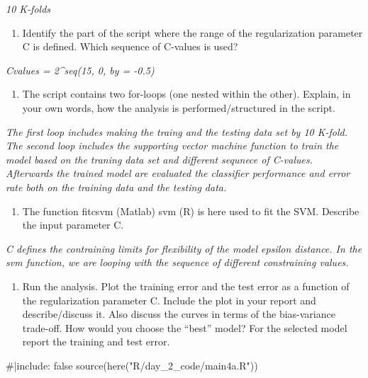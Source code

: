 \documentclass[
  letterpaper,
  DIV=11,
  numbers=noendperiod]{scrartcl}
\newenvironment{Shaded}{\begin{snugshade}}{\end{snugshade}}
\newcommand{\CommentTok}[1]{\textcolor[rgb]{0.37,0.37,0.37}{#1}}
\newcommand{\FunctionTok}[1]{\textcolor[rgb]{0.28,0.35,0.67}{#1}}
\newcommand{\NormalTok}[1]{\textcolor[rgb]{0.00,0.23,0.31}{#1}}
\newcommand{\StringTok}[1]{\textcolor[rgb]{0.13,0.47,0.30}{#1}}
\providecommand{\tightlist}{%
  \setlength{\itemsep}{0pt}\setlength{\parskip}{0pt}}\usepackage{longtable,booktabs,array}
\begin{document}
\emph{10 K-folds}

\begin{enumerate}
\def\labelenumi{(\alph{enumi})}
\setcounter{enumi}{2}
\tightlist
\item
  Identify the part of the script where the range of the regularization
  parameter C is defined. Which sequence of C-values is used?
\end{enumerate}

\emph{Cvalues = 2\^{}seq(15, 0, by = -0.5)}

\begin{enumerate}
\def\labelenumi{(\alph{enumi})}
\setcounter{enumi}{3}
\tightlist
\item
  The script contains two for-loops (one nested within the other).
  Explain, in your own words, how the analysis is performed/structured
  in the script.
\end{enumerate}

\emph{The first loop includes making the traing and the testing data set
by 10 K-fold. The second loop includes the supporting vector machine
function to train the model based on the traning data set and different
sequnece of C-values. Afterwards the trained model are evaluated the
classifier performance and error rate both on the training data and the
testing data.}

\begin{enumerate}
\def\labelenumi{(\alph{enumi})}
\setcounter{enumi}{4}
\tightlist
\item
  The function fitcsvm (Matlab) svm (R) is here used to fit the SVM.
  Describe the input parameter C.
\end{enumerate}

\emph{C defines the contraining limits for flexibility of the model
epsilon distance. In the svm function, we are looping with the sequence
of different constraining values.}

\begin{enumerate}
\def\labelenumi{(\alph{enumi})}
\setcounter{enumi}{5}
\tightlist
\item
  Run the analysis. Plot the training error and the test error as a
  function of the regularization parameter C. Include the plot in your
  report and describe/discuss it. Also discuss the curves in terms of
  the bias-variance trade-off. How would you choose the ``best'' model?
  For the selected model report the training and test error.
\end{enumerate}

\begin{Shaded}
\begin{Highlighting}[]
\CommentTok{\#|include: false}
\FunctionTok{source}\NormalTok{(}\FunctionTok{here}\NormalTok{(}\StringTok{"R/day\_2\_code/main4a.R"}\NormalTok{))}
\end{Highlighting}
\end{Shaded}
\end{document}
